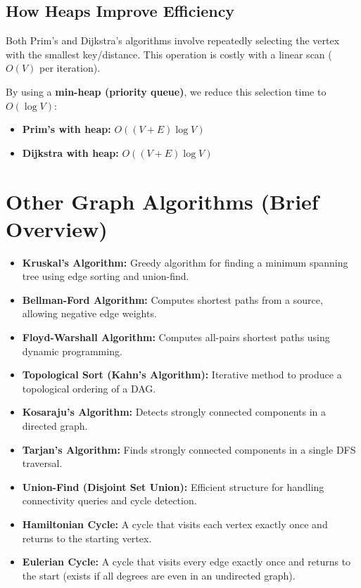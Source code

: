 \documentclass{article}
\begin{document}
\subsection{How Heaps Improve Efficiency}

Both Prim’s and Dijkstra’s algorithms involve repeatedly selecting the vertex with the smallest key/distance. This operation is costly with a linear scan ($O(V)$ per iteration).

By using a \textbf{min-heap (priority queue)}, we reduce this selection time to $O(\log V)$:
\begin{itemize}
    \item \textbf{Prim's with heap:} $O((V + E) \log V)$
    \item \textbf{Dijkstra with heap:} $O((V + E) \log V)$
\end{itemize}

\section{Other Graph Algorithms (Brief Overview)}

\begin{itemize}
    \item \textbf{Kruskal’s Algorithm:} Greedy algorithm for finding a minimum spanning tree using edge sorting and union-find.
    \item \textbf{Bellman-Ford Algorithm:} Computes shortest paths from a source, allowing negative edge weights.
    \item \textbf{Floyd-Warshall Algorithm:} Computes all-pairs shortest paths using dynamic programming.
    \item \textbf{Topological Sort (Kahn’s Algorithm):} Iterative method to produce a topological ordering of a DAG.
    \item \textbf{Kosaraju’s Algorithm:} Detects strongly connected components in a directed graph.
    \item \textbf{Tarjan’s Algorithm:} Finds strongly connected components in a single DFS traversal.
    \item \textbf{Union-Find (Disjoint Set Union):} Efficient structure for handling connectivity queries and cycle detection.
    \item \textbf{Hamiltonian Cycle:} A cycle that visits each vertex exactly once and returns to the starting vertex.
    \item \textbf{Eulerian Cycle:} A cycle that visits every edge exactly once and returns to the start (exists if all degrees are even in an undirected graph).
\end{itemize}
\end{document}
